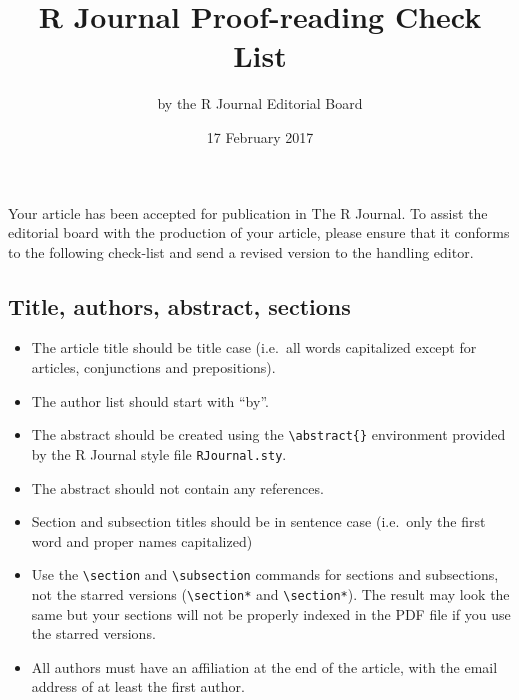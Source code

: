 \documentclass[11pt]{article}
\begin{document}
\title{R Journal Proof-reading Check List}
\author{by the R Journal Editorial Board}
\date{17 February 2017}
\maketitle

Your article has been accepted for publication in The R Journal. To
assist the editorial board with the production of your article, please
ensure that it conforms to the following check-list and send a revised
version to the handling editor.

\subsection*{Title, authors, abstract, sections}
\begin{itemize}
\item The article title should be title case (i.e.\ all words capitalized
   except for articles, conjunctions and prepositions).
\item The author list should start with ``by''.
\item The abstract should be created using the \verb+\abstract{}+
   environment provided by the R Journal style file \texttt{RJournal.sty}.
\item The abstract should not contain any references.
\item  Section and subsection titles should be in sentence case (i.e.\ only
   the first word and proper names capitalized)
\item Use the \verb+\section+ and \verb+\subsection+ commands for sections and 
      subsections, not the starred versions (\verb+\section*+
      and \verb+\section*+). The result may look the same but your
      sections will not be properly indexed in the PDF file if you use
      the starred versions.
\item All authors must have an affiliation at the end of the article,
      with the email address of at least the first author.
\end{itemize}
\end{document}

